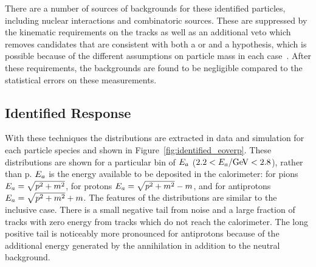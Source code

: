 There are a number of sources of backgrounds for these identified particles, including nuclear interactions and combinatoric sources.
These are suppressed by the kinematic requirements on the tracks as well as an additional veto which removes candidates that are consistent with both a \pL or \pLB and a \pKS hypothesis, which is possible because of the different assumptions on particle mass in each case~\cite{PERF-2011-05}.
After these requirements, the backgrounds are found to be negligible compared to the statistical errors on these measurements. 

\subsection{Identified Response}
With these techniques the \ep distributions are extracted in data and simulation for each particle species and shown in Figure~\ref{fig:identified_eoverp}. 
These distributions are shown for a particular bin of $E_a$ ($2.2 < \Ea / \GeV < 2.8$),  rather than p. 
$E_a$ is the energy available to be deposited in the calorimeter: for pions $E_a = \sqrt{p^2 + m^2}$, for protons $E_a = \sqrt{p^2 + m^2} - m$, and for antiprotons $E_a = \sqrt{p^2 + m^2} + m$.
The features of the \ep distributions are similar to the inclusive case.
There is a small negative tail from noise and a large fraction of tracks with zero energy from tracks which do not reach the calorimeter.
The long positive tail is noticeably more pronounced for antiprotons because of the additional energy generated by the annihilation in addition to the neutral background. 

